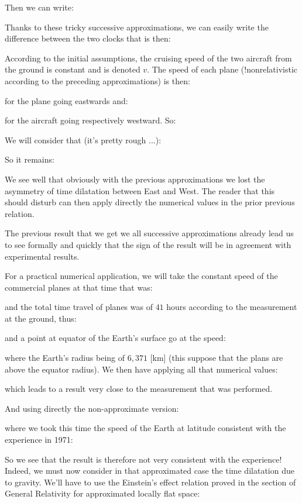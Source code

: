 	Then we can write:
	
	Thanks to these tricky successive approximations, we can easily write the difference between the two clocks that is then:
	
	According to the initial assumptions, the cruising speed of the two aircraft from the ground is constant and is denoted $v$. The speed of each plane (!nonrelativistic according to the preceding approximations) is then:
	
	for the plane going eastwards and:
	
	for the aircraft going respectively westward. So:
	
	We will consider that (it's pretty rough ...):
	
	So it remains:
	
	We see well that obviously with the previous approximations we lost the asymmetry of time dilatation between East and West. The reader that this should disturb can then apply directly the numerical values in the prior previous relation.

	The previous result that we get we all successive approximations already lead us to see formally and quickly that the sign of the result will be in agreement with experimental results.

	For a practical numerical application, we will take the constant speed of the commercial planes at that time that was:
	
	and the total time travel of planes was of $41$ hours according to the measurement at the ground, thus:
	
	and a point at equator of the Earth's surface go at the speed:
	
	where the Earth's radius being of $6,371$ [km] (this suppose that the plans are above the equator radius). We then have applying all that numerical values:
	
	which leads to a result very close to the measurement that was performed.

	And using directly the non-approximate version:
	
	where we took this time the speed of the Earth at latitude consistent with the experience in 1971:
	
	So we see that the result is therefore not very consistent with the experience! Indeed, we must now consider in that approximated case the time dilatation due to gravity. We'll have to use the Einstein's effect relation proved in the section of General Relativity for approximated locally flat space:
	

